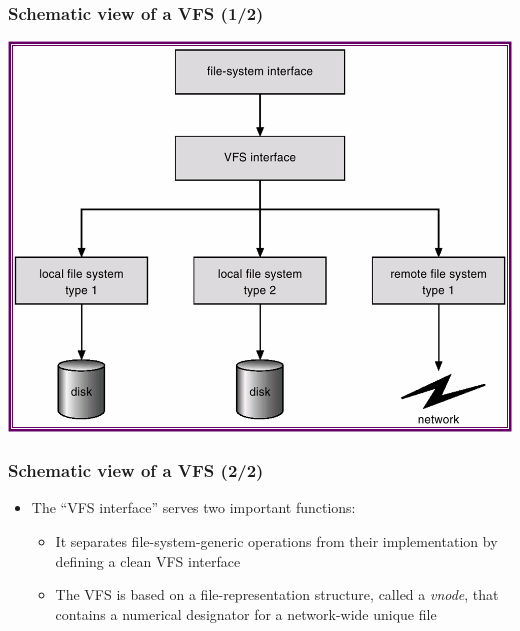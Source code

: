 \documentclass[CJKutf8,xcolor=pdftex,dvipsnames,table]{beamer}
\begin{document}
\begin{CJK*}{UTF8}{song}
  \begin{frame}
    \frametitle{Schematic view of a VFS (1/2)} \pause
    \begin{center}
      \includegraphics[scale=.5]{v6f12-4}
    \end{center}
  \end{frame}
  
  \begin{frame}
    \frametitle{Schematic view of a VFS (2/2)} \pause
    \begin{itemize}\parskip=0pt
    \item The ``VFS interface'' serves two important functions: \pause
      \begin{itemize}\parskip=0pt
      \item It separates file-system-generic operations from their implementation by defining a clean VFS interface \pause
      \item The VFS is based on a file-representation structure, called a \emph{vnode}, that contains a numerical designator for a network-wide unique file
      \end{itemize}
    \end{itemize}
  \end{frame}
  

\end{CJK*}
\end{document}
